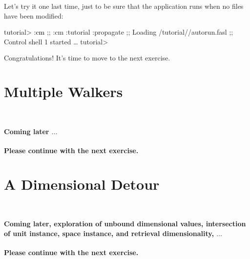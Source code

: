 \documentclass[10pt,twoside,english,pdftex]{article}
\begin{document}
Let's try it one last time, just to be sure that the application runs when no
files have been modified:
%
\W\supp
\begin{smallexample}
\textcolor{darkergray}{%
  tutorial> \textcolor{black}{:cm}
  ;; :cm :tutorial :propagate
  ;; Loading /tutorial//autorun.fasl
  ;; Control shell 1 started
     \textrm{\ldots{}}
  tutorial>}
\end{smallexample}

Congratulations!  It's time to move to the next exercise.


\T\markright{}%
\T\pagestyle{plain}
\T\cleardoublepage
\W{}
\T\pagestyle{fancy}
\T\thispagestyle{fancybottom}
\T\renewcommand{\headrulewidth}{0pt}
\section{Multiple Walkers}
\label{sec:multiple-walkers}%

\T\medskip
\T\fndocrule\\
\T\begin{center}
\textcolor{darkergray}{\textsf{\textbf{Coming later $\ldots$\\~\\ 
 Please continue with the next exercise.}}}
\T\end{center}
\T\fndocrule


\T\markright{}%
\T\pagestyle{plain}
\T\cleardoublepage
\W{}
\T\pagestyle{fancy}
\T\thispagestyle{fancybottom}
\T\renewcommand{\headrulewidth}{0pt}
\section{A Dimensional Detour}
\label{sec:detour}%


\T\medskip
\T\fndocrule\\
\T\begin{center}
\textcolor{darkergray}{\textsf{\textbf{Coming later, exploration of unbound
 dimensional values, intersection of unit instance, space instance, and retrieval
 dimensionality, $\ldots$\\~\\ 
 Please continue with the next exercise.}}}
\T\end{center}
\T\fndocrule
\end{document}
